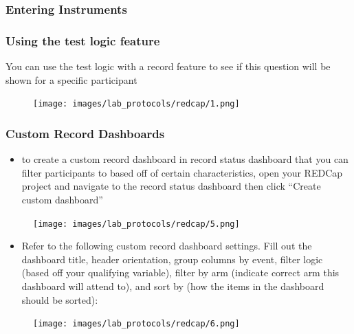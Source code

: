 \documentclass[
]{book}
\providecommand{\tightlist}{%
  \setlength{\itemsep}{0pt}\setlength{\parskip}{0pt}}
\begin{document}
\hypertarget{entering-instruments}{%
\subsubsection{Entering Instruments}\label{entering-instruments}}

\hypertarget{using-the-test-logic-feature}{%
\subsubsection{Using the test logic feature}\label{using-the-test-logic-feature}}

You can use the test logic with a record feature to see if this question will be shown for a specific participant

\begin{figure}
\centering
\texttt{[image: images/lab\_protocols/redcap/1.png]}
\caption{}
\end{figure}

\hypertarget{custom-record-dashboards}{%
\subsubsection{Custom Record Dashboards}\label{custom-record-dashboards}}

\begin{itemize}
\tightlist
\item
  to create a custom record dashboard in record status dashboard that you can filter participants to based off of certain characteristics, open your REDCap project and navigate to the record status dashboard then click ``Create custom dashboard''
\end{itemize}

\begin{figure}
\centering
\texttt{[image: images/lab\_protocols/redcap/5.png]}
\caption{}
\end{figure}

\begin{itemize}
\tightlist
\item
  Refer to the following custom record dashboard settings. Fill out the dashboard title, header orientation, group columns by event, filter logic (based off your qualifying variable), filter by arm (indicate correct arm this dashboard will attend to), and sort by (how the items in the dashboard should be sorted):
\end{itemize}

\begin{figure}
\centering
\texttt{[image: images/lab\_protocols/redcap/6.png]}
\caption{}
\end{figure}
\end{document}
